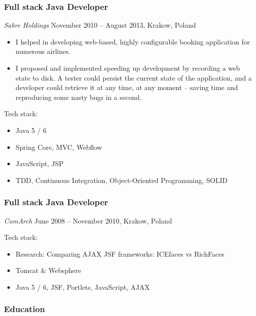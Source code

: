 \documentclass[]{rss}
\providecommand{\tightlist}{%
  \setlength{\itemsep}{0pt}\setlength{\parskip}{0pt}}
\begin{document}
\begin{resume}
\subsubsection{Full stack Java
Developer}\label{full-stack-java-developer}

\emph{Sabre Holdings} November 2010 -- August 2013, Krakow, Poland

\begin{itemize}
\item
  I helped in developing web-based, highly configurable booking
  application for numerous airlines.
\item
  I proposed and implemented speeding up development by recording a web
  state to disk. A tester could persist the current state of the
  application, and a developer could retrieve it at any time, at any
  moment -- saving time and reproducing some nasty bugs in a second.
\end{itemize}

Tech stack:

\begin{itemize}
\tightlist
\item
  Java 5 / 6
\item
  Spring Core, MVC, Webflow
\item
  JavaScript, JSP
\item
  TDD, Continuous Integration, Object-Oriented Programming, SOLID
\end{itemize}

\subsubsection{Full stack Java
Developer}\label{full-stack-java-developer-1}

\emph{ComArch} June 2008 -- November 2010, Krakow, Poland

Tech stack:

\begin{itemize}
\tightlist
\item
  Research: Comparing AJAX JSF frameworks: ICEfaces vs RichFaces
\item
  Tomcat \& Websphere
\item
  Java 5 / 6, JSF, Portlets, JavaScript, AJAX
\end{itemize}

\subsubsection{Education}\label{education}


\end{resume}
\end{document}

